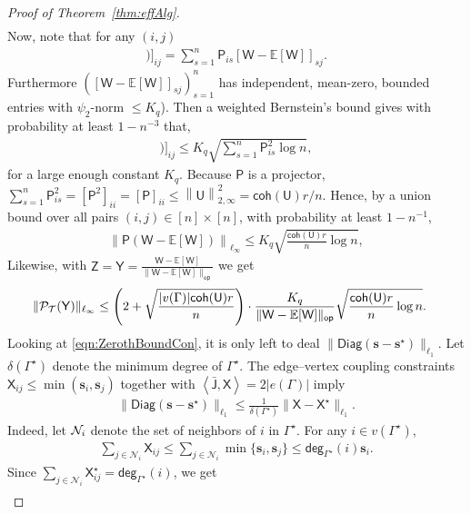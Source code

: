 \documentclass[12pt]{article}
\newcommand{\bE}{\mathbb{E}}
\newcommand{\calN}{{\cal N}}
\newcommand{\calP}{{\cal P}}
\newcommand{\calT}{{\cal T}}
\newcommand{\p}[1]{\left(#1\right)}
\newcommand{\norm}[1]{\left\|#1\right\|}
\newcommand{\innerP}[1]{\left\langle#1\right\rangle}
\newcommand{\s}[1]{\mathsf{#1}}
\begin{document}
\begin{proof}[Proof of Theorem~\ref{thm:effAlg}]
\begin{align}
\end{align}
Now, note that for any $(i,j)$
\begin{align}
[\s{P}(\s{W}-\bE[\s{W}])]_{ij} = \sum_{s=1}^n \s{P}_{is}[\s{W}-\bE[\s{W}]]_{sj}.
\end{align}
Furthermore $([\s{W}-\bE[\s{W}]]_{sj})_{s=1}^n$ has independent, mean-zero, bounded entries with $\psi_2$-norm $\leq K_q$). Then a weighted Bernstein's bound gives with probability at least $1-n^{-3}$ that,
\begin{align}
   [\s{P}(\s{W}-\bE[\s{W}])]_{ij}\leq K_q\sqrt{\sum_{s=1}^n \s{P}_{is}^2\log n},
\end{align}
for a large enough constant $K_q$. Because $\s{P}$ is a projector, $\sum_{s=1}^n \s{P}_{is}^2 = [\s{P}^2]_{ii} = [\s{P}]_{ii} \leq \norm{\s{U}}_{2,\infty}^2 = \s{coh}(\s{U}) r/n$. Hence, by a union bound over all pairs $(i,j) \in [n]\times [n]$, with probability at least $1-n^{-1}$,
\begin{align}
\norm{\s{P}(\s{W}-\bE[\s{W}])}_{\ell_\infty} \leq K_q\sqrt{\frac{\s{coh}(\s{U}) r}{n} \log n},
\end{align}
Likewise, with $\s{Z}=\s{Y}=\frac{\s{W}-\bE[\s{W}]}{\|\s{W}-\bE[\s{W}]\|_{\s{op}}}$ we get
\begin{align}
\|\calP_{\calT}(\s{Y})\|_{\ell_\infty}
&\leq\p{2 + \sqrt{ \frac{|v(\Gamma)|  \s{coh}(\s{U})r}{n}}}\cdot
\frac{K_q}{\|\s{W}-\bE[\s{W}]\|_{\s{op}}}\sqrt{\frac{\s{coh}(\s{U}) r}{n} \log n}.
\label{eqn:PTnormY}
\end{align}
Looking at \eqref{eqn:ZerothBoundCon}, it is only left to deal $\|\s{Diag}(\mathbf{s}-\mathbf{s}^\star)\|_{\ell_1}$. Let $\delta(\Gamma^\star)$ denote the minimum degree of $\Gamma^\star$. The edge--vertex coupling constraints $\s{X}_{ij}\leq \min(\mathbf{s}_i,\mathbf{s}_j)$ together with $\innerP{\bar{\s{J}},\s{X}}=2|e(\Gamma)|$ imply
\begin{align}
\|\s{Diag}(\mathbf{s}-\mathbf{s}^\star)\|_{\ell_1}\leq\frac{1}{\delta(\Gamma^\star)}\|\s{X}-\s{X}^\star\|_{\ell_1}.
\label{eqn:couplingBound}
\end{align}
Indeed, let $\calN_i$ denote the set of neighbors of $i$ in $\Gamma^\star$. For any $i\in v(\Gamma^\star)$,
\begin{align}
\sum_{j\in\mathcal N_i} \s{X}_{ij}
\leq\sum_{j\in\mathcal N_i}\min\{\mathbf{s}_i,\mathbf{s}_j\}
\leq\s{deg}_{\Gamma^\star}(i)\mathbf{s}_i.
\end{align}
Since $ \sum_{j\in\mathcal N_i}\s{X}^\star_{ij}=\s{deg}_{\Gamma^\star}(i) $, we get
\begin{align}

\end{align}
\end{proof}
\end{document}

